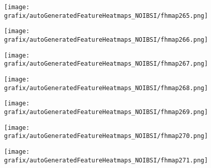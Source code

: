 \begin{subfigure}{\wid\textwidth} 
    \centering 
    \caption{\tiny \sffamily {}} 
    \vspace{\vsp} 
    \texttt{[image: grafix/autoGeneratedFeatureHeatmaps\_NOIBSI/fhmap265.png]} 
\end{subfigure} 
\hspace{\hsp} 
\begin{subfigure}{\wid\textwidth} 
    \centering 
    \caption{\tiny \sffamily {}} 
    \vspace{\vsp} 
    \texttt{[image: grafix/autoGeneratedFeatureHeatmaps\_NOIBSI/fhmap266.png]} 
\end{subfigure} 
\hspace{\hsp} 
\begin{subfigure}{\wid\textwidth} 
    \centering 
    \caption{\tiny \sffamily {}} 
    \vspace{\vsp} 
    \texttt{[image: grafix/autoGeneratedFeatureHeatmaps\_NOIBSI/fhmap267.png]} 
\end{subfigure} 
\hspace{\hsp} 
\begin{subfigure}{\wid\textwidth} 
    \centering 
    \caption{\tiny \sffamily {}} 
    \vspace{\vsp} 
    \texttt{[image: grafix/autoGeneratedFeatureHeatmaps\_NOIBSI/fhmap268.png]} 
\end{subfigure} 
\hspace{\hsp} 
\begin{subfigure}{\wid\textwidth} 
    \centering 
    \caption{\tiny \sffamily {}} 
    \vspace{\vsp} 
    \texttt{[image: grafix/autoGeneratedFeatureHeatmaps\_NOIBSI/fhmap269.png]} 
\end{subfigure} 
\hspace{\hsp} 
\begin{subfigure}{\wid\textwidth} 
    \centering 
    \caption{\tiny \sffamily {}} 
    \vspace{\vsp} 
    \texttt{[image: grafix/autoGeneratedFeatureHeatmaps\_NOIBSI/fhmap270.png]} 
\end{subfigure} 
\hspace{\hsp} 
\begin{subfigure}{\wid\textwidth} 
    \centering 
    \caption{\tiny \sffamily {}} 
    \vspace{\vsp} 
    \texttt{[image: grafix/autoGeneratedFeatureHeatmaps\_NOIBSI/fhmap271.png]} 
\end{subfigure} 
